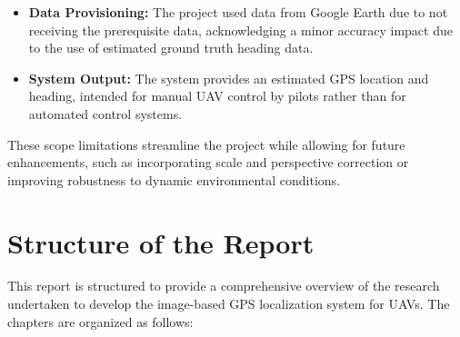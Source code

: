 \begin{itemize}
    \item \textbf{Data Provisioning:} The project used data from Google Earth due to not receiving the prerequisite data, acknowledging a minor accuracy impact due to the use of estimated ground truth heading data.
    
    \item \textbf{System Output:} The system provides an estimated GPS location and heading, intended for manual UAV control by pilots rather than for automated control systems.
    
\end{itemize}

These scope limitations streamline the project while allowing for future enhancements, such as incorporating scale and perspective correction or improving robustness to dynamic environmental conditions.

\section{Structure of the Report}
This report is structured to provide a comprehensive overview of the research undertaken to develop the image-based GPS localization system for UAVs. The chapters are organized as follows:


